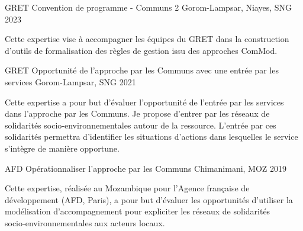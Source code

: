 

\begin{cventries}

  \cventry
    {GRET} %
    {Convention de programme - Communs 2} %
    {Gorom-Lampsar, Niayes, SNG} %
    {2023} %
    {
      \begin{cvitems} %
        Cette expertise vise à accompagner les équipes du GRET dans la construction d'outils de formalisation des règles de gestion issu des approches ComMod.
      \end{cvitems}
    }

  \cventry
    {GRET} %
    {Opportunité de l’approche par les Communs avec une entrée par les services} %
    {Gorom-Lampsar, SNG} %
    {2021} %
    {
      \begin{cvitems} %
        Cette expertise a pour but d’évaluer l’opportunité de l’entrée par les services dans l’approche par les Communs. Je propose d’entrer par les réseaux de solidarités socio‑environnementales autour de la ressource. L’entrée par ces solidarités permettra d’identifier les situations d’actions dans lesquelles le service s’intègre de manière opportune.
      \end{cvitems}
    }

    \cventry
      {AFD} %
      {Opérationnaliser l’approche par les Communs} %
      {Chimanimani, MOZ} %
      {2019} %
      {
        \begin{cvitems} %
          Cette expertise, réalisée au Mozambique pour l'Agence française de développement (AFD, Paris), a pour but d'évaluer les opportunités d’utiliser la modélisation d’accompagnement pour expliciter les réseaux de solidarités socio‑environnementales aux acteurs locaux.
        \end{cvitems}
      }


\end{cventries}
